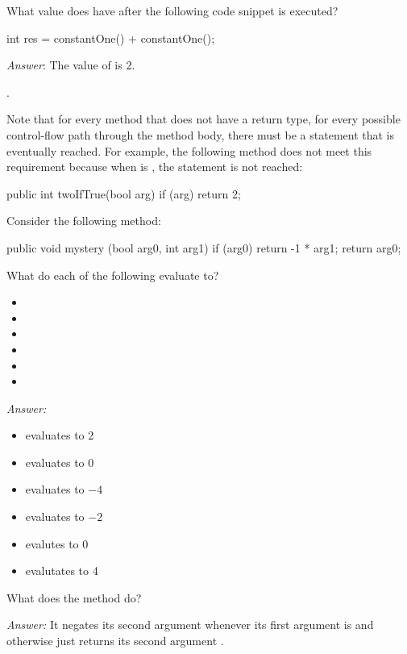 \begin{example}
What value does  have after the following code snippet is executed?
\begin{code}
int res = constantOne() + constantOne();
\end{code}
\emph{Answer}: The value of  is 2.
\end{example}.

Note that for every method that does not have a  return type,
for every possible control-flow path through the method body,
there must be a  statement that is eventually reached.
For example, the following method does not meet this requirement
because when  is , the  statement is not
reached:
\begin{code}
public int twoIfTrue(bool arg) {
  if (arg) {
    return 2;
  }
}
\end{code}

\begin{example}
Consider the following method:
\begin{code}
public void mystery (bool arg0, int arg1) {
  if (arg0) {
    return -1 * arg1;
  }
  return arg0;
}
\end{code}

\noindent What do each of the following evaluate to?
\begin{itemize}
\item {}
\item {}
\item {}
\item {}
\item {}
\item {}
\end{itemize}

\noindent \emph{Answer:}
\begin{itemize}
\item {} evaluates to 2
\item {} evaluates to 0
\item {} evaluates to $-4$
\item {} evaluates to $-2$
\item {} evalutes to 0
\item {} evalutates to 4
\end{itemize}

\noindent What does the method do?

\noindent \emph{Answer:} It negates its second argument
 whenever its first argument  is
 and otherwise just returns its second argument
.
\end{example}

